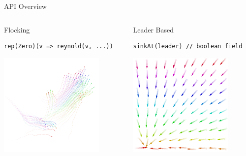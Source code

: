 \documentclass[presentation, 9pt]{beamer}\mode<presentation>{\usetheme{AMSBolognaFC}}
\begin{document}
\begin{frame}[fragile]{API Overview}
\begin{columns}
\begin{column}{0.31\textwidth}
\begin{exampleblock}{Flocking\emph{\tiny{~\cite{reynolds1987flocks}}}}
\begin{verbatim}
rep(Zero)(v => reynold(v, ...))
\end{verbatim}
\centering
\includegraphics[width=0.8\textwidth]{img/flock.png}
\end{exampleblock}

\end{column}

\begin{column}{0.31\textwidth}
	\begin{exampleblock}{Leader Based\emph{\tiny{~\cite{DBLP:journals/tcst/GuW09}}}}
	\begin{verbatim}
sinkAt(leader) // boolean field
	\end{verbatim}
	\centering
	\includegraphics[width=0.8\textwidth]{img/towards-leader.png}
	\end{exampleblock}
\end{column}


\end{columns}
\end{frame}
\end{document}
